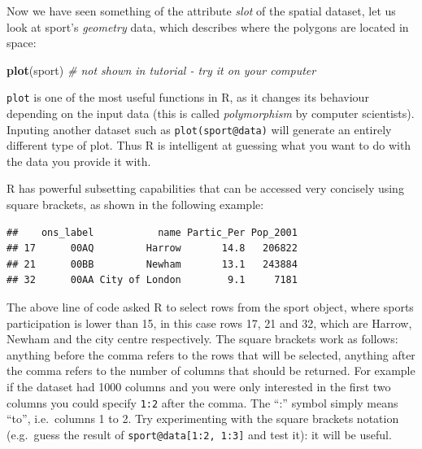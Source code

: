 \documentclass[]{article}
\newenvironment{Shaded}{}{}
\newcommand{\KeywordTok}[1]{\textcolor[rgb]{0.00,0.44,0.13}{\textbf{{#1}}}}
\newcommand{\DecValTok}[1]{\textcolor[rgb]{0.25,0.63,0.44}{{#1}}}
\newcommand{\CommentTok}[1]{\textcolor[rgb]{0.38,0.63,0.69}{\textit{{#1}}}}
\newcommand{\NormalTok}[1]{{#1}}
\begin{document}
Now we have seen something of the attribute \emph{slot} of the spatial
dataset, let us look at sport's \emph{geometry} data, which describes
where the polygons are located in space:

\begin{Shaded}
\begin{Highlighting}[]
\KeywordTok{plot}\NormalTok{(sport)  }\CommentTok{# not shown in tutorial - try it on your computer}
\end{Highlighting}
\end{Shaded}
\texttt{plot} is one of the most useful functions in R, as it changes
its behaviour depending on the input data (this is called
\emph{polymorphism} by computer scientists). Inputing another dataset
such as \texttt{plot(sport@data)} will generate an entirely different
type of plot. Thus R is intelligent at guessing what you want to do with
the data you provide it with.

R has powerful subsetting capabilities that can be accessed very
concisely using square brackets, as shown in the following example:

\begin{Shaded}
\end{Shaded}
\begin{verbatim}
##    ons_label           name Partic_Per Pop_2001
## 17      00AQ         Harrow       14.8   206822
## 21      00BB         Newham       13.1   243884
## 32      00AA City of London        9.1     7181
\end{verbatim}
The above line of code asked R to select rows from the sport object,
where sports participation is lower than 15, in this case rows 17, 21
and 32, which are Harrow, Newham and the city centre respectively. The
square brackets work as follows: anything before the comma refers to the
rows that will be selected, anything after the comma refers to the
number of columns that should be returned. For example if the dataset
had 1000 columns and you were only interested in the first two columns
you could specify \texttt{1:2} after the comma. The ``:'' symbol simply
means ``to'', i.e.~columns 1 to 2. Try experimenting with the square
brackets notation (e.g.~guess the result of
\texttt{sport@data{[}1:2, 1:3{]}} and test it): it will be useful.
\end{document}
